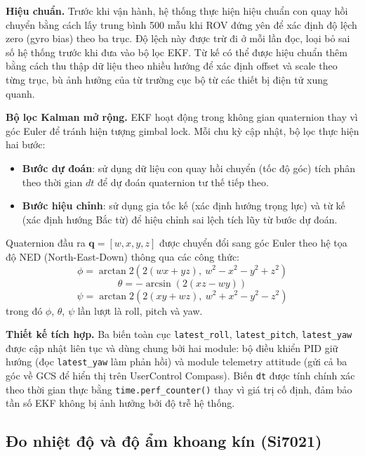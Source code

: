 \documentclass[../DoAn.tex]{subfiles}
\begin{document}
\textbf{Hiệu chuẩn.}
Trước khi vận hành, hệ thống thực hiện hiệu chuẩn con quay hồi chuyển
bằng cách lấy trung bình 500 mẫu khi ROV đứng yên để xác định độ
lệch zero (gyro bias) theo ba trục. Độ lệch này được trừ đi ở mỗi
lần đọc, loại bỏ sai số hệ thống trước khi đưa vào bộ lọc EKF. Từ
kế có thể được hiệu chuẩn thêm bằng cách thu thập dữ liệu theo nhiều
hướng để xác định offset và scale theo từng trục, bù ảnh hưởng của
từ trường cục bộ từ các thiết bị điện tử xung quanh.

\textbf{Bộ lọc Kalman mở rộng.}
EKF hoạt động trong không gian quaternion thay vì góc Euler để tránh
hiện tượng gimbal lock. Mỗi chu kỳ cập nhật, bộ lọc thực hiện hai
bước:
\begin{itemize}
    \item \textbf{Bước dự đoán}: sử dụng dữ liệu con quay hồi chuyển
    (tốc độ góc) tích phân theo thời gian $dt$ để dự đoán quaternion
    tư thế tiếp theo.
    \item \textbf{Bước hiệu chỉnh}: sử dụng gia tốc kế (xác định
    hướng trọng lực) và từ kế (xác định hướng Bắc từ) để hiệu chỉnh
    sai lệch tích lũy từ bước dự đoán.
\end{itemize}

Quaternion đầu ra $\mathbf{q} = [w, x, y, z]$ được chuyển đổi sang
góc Euler theo hệ tọa độ NED (North-East-Down) thông qua các công
thức:
\begin{equation}
    \phi = \arctan2\!\left(2(wx + yz),\ w^2 - x^2 - y^2 + z^2\right)
\end{equation}
\begin{equation}
    \theta = -\arcsin\!\left(2(xz - wy)\right)
\end{equation}
\begin{equation}
    \psi = \arctan2\!\left(2(xy + wz),\ w^2 + x^2 - y^2 - z^2\right)
\end{equation}
trong đó $\phi$, $\theta$, $\psi$ lần lượt là roll, pitch và yaw.

\textbf{Thiết kế tích hợp.}
Ba biến toàn cục \texttt{latest\_roll}, \texttt{latest\_pitch},
\texttt{latest\_yaw} được cập nhật liên tục và dùng chung bởi hai
module: bộ điều khiển PID giữ hướng (đọc \texttt{latest\_yaw} làm
phản hồi) và module telemetry attitude (gửi cả ba góc về GCS để hiển
thị trên UserControl Compass). Biến \texttt{dt} được tính chính xác
theo thời gian thực bằng \texttt{time.perf\_counter()} thay vì giá
trị cố định, đảm bảo tần số EKF không bị ảnh hưởng bởi độ trễ hệ
thống.

\subsection{Đo nhiệt độ và độ ẩm khoang kín (Si7021)}
\end{document}
